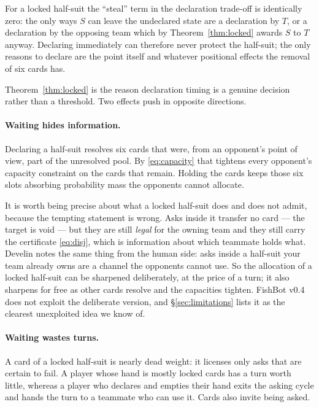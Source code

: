 \begin{corollary}
\label{cor:wait}
For a locked half-suit the ``steal'' term in the declaration trade-off is
identically zero: the only ways $S$ can leave the undeclared state are a
declaration by $T$, or a declaration by the opposing team which by
Theorem~\ref{thm:locked} awards $S$ to $T$ anyway. Declaring immediately can
therefore never protect the half-suit; the only reasons to declare are the point
itself and whatever positional effects the removal of six cards has.
\end{corollary}

Theorem~\ref{thm:locked} is the reason declaration timing is a genuine decision
rather than a threshold. Two effects push in opposite directions.

\paragraph{Waiting hides information.} Declaring a half-suit resolves six cards
that were, from an opponent's point of view, part of the unresolved pool. By
\eqref{eq:capacity} that tightens every opponent's capacity constraint on the
cards that remain. Holding the cards keeps those six slots absorbing probability
mass the opponents cannot allocate.

It is worth being precise about what a locked half-suit does and does not admit,
because the tempting statement is wrong. Asks inside it transfer no card --- the
target is void --- but they are still \emph{legal} for the owning team and they
still carry the certificate \eqref{eq:disj}, which is information about which
teammate holds what. Develin notes the same thing from the human side: asks
inside a half-suit your team already owns are a channel the opponents cannot
use. So the allocation of a locked half-suit can be sharpened deliberately, at
the price of a turn; it also sharpens for free as other cards resolve and the
capacities tighten. FishBot v0.4 does not exploit the deliberate version, and
\S\ref{sec:limitations} lists it as the clearest unexploited idea we know of.

\paragraph{Waiting wastes turns.} A card of a locked half-suit is nearly dead
weight: it licenses only asks that are certain to fail. A player whose hand is
mostly locked cards has a turn worth little, whereas a player who declares and
empties their hand exits the asking cycle and hands the turn to a teammate who
can use it. Cards also invite being asked.

